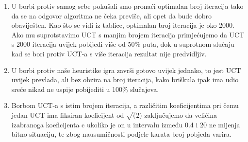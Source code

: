 \documentclass[20pt, a0paper, portrait, margin=0mm, innermargin=15mm,
     blockverticalspace=15mm, colspace=15mm, subcolspace=8mm]{tikzposter}
\begin{document}
\begin{columns}
{            \begin{enumerate}
                \item U borbi protiv samog sebe pokušali smo pronaći optimalan broj iteracija tako da se na
odgovor algoritma ne čeka previše, ali opet da bude dobro obaviješten. Kao što se vidi iz tablice, optimalan broj iteracija je oko 2000. Ako mu suprotstavimo UCT s manjim brojem iteracija primjećujemo da UCT s 2000 iteracija uvijek pobijedi više od 50\% puta, dok u suprotnom slučaju kad se bori protiv UCT-a s više iteracija rezultat nije predvidljiv.

                \item U borbi protiv naše heuristike igra završi gotovo
uvijek jednako, to jest UCT uvijek prevlada, ali bez obzira na broj iteracija, kako briškula ipak ima
udio sreće nikad ne uspije pobijediti u 100\% slučajeva.

                \item Borbom UCT-a s istim brojem iteracija, a različitim koeficijentima pri čemu jedan UCT ima
fiksiran koeficijent od $\sqrt(2)$ zaključujemo da veličina izabranoga koeficijenta c ukoliko je on u intervalu
između 0.4 i 20 ne mijenja bitno situaciju, te zbog nausumičnosti podjele karata broj pobjeda varira.
            \end{enumerate}


        }
        
        
        
        
        
        
    \end{columns}



    
\end{document}
